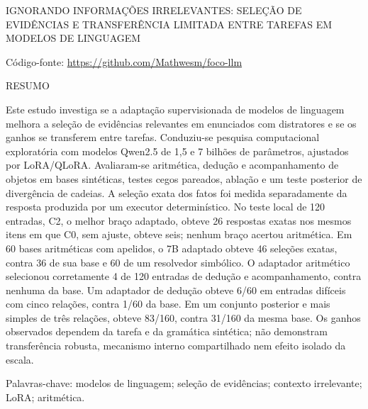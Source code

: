 \documentclass[12pt,a4paper]{article}
\begin{document}
\begin{center}\MakeUppercase{Ignorando informações irrelevantes: seleção de evidências e transferência limitada entre tarefas em modelos de linguagem}\end{center}
\begin{singlespace}
\noindent Código-fonte: \url{https://github.com/Mathwesm/foco-llm}\par
\end{singlespace}
\begin{singlespace}
\noindent RESUMO\par
\noindent Este estudo investiga se a adaptação supervisionada de modelos de linguagem melhora a seleção de evidências relevantes em enunciados com distratores e se os ganhos se transferem entre tarefas. Conduziu-se pesquisa computacional exploratória com modelos Qwen2.5 de 1,5 e 7 bilhões de parâmetros, ajustados por LoRA/QLoRA. Avaliaram-se aritmética, dedução e acompanhamento de objetos em bases sintéticas, testes cegos pareados, ablação e um teste posterior de divergência de cadeias. A seleção exata dos fatos foi medida separadamente da resposta produzida por um executor determinístico. No teste local de 120 entradas, C2, o melhor braço adaptado, obteve 26 respostas exatas nos mesmos itens em que C0, sem ajuste, obteve seis; nenhum braço acertou aritmética. Em 60 bases aritméticas com apelidos, o 7B adaptado obteve 46 seleções exatas, contra 36 de sua base e 60 de um resolvedor simbólico. O adaptador aritmético selecionou corretamente 4 de 120 entradas de dedução e acompanhamento, contra nenhuma da base. Um adaptador de dedução obteve 6/60 em entradas difíceis com cinco relações, contra 1/60 da base. Em um conjunto posterior e mais simples de três relações, obteve 83/160, contra 31/160 da mesma base. Os ganhos observados dependem da tarefa e da gramática sintética; não demonstram transferência robusta, mecanismo interno compartilhado nem efeito isolado da escala.

\noindent Palavras-chave: modelos de linguagem; seleção de evidências; contexto irrelevante; LoRA; aritmética.
\end{singlespace}
\end{document}
